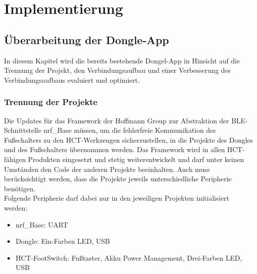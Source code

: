 \section{Implementierung}
\label{Implementierung}

\subsection{Überarbeitung der Dongle-App}
\label{ÜberarbeitungDongleApp}
In diesem Kapitel wird die bereits bestehende Dongel-App in Hinsicht auf die Trennung der Projekt, den Verbindungsaufbau und einer Verbesserung des Verbindungsaufbaus evaluiert und optimiert.

\subsubsection{Trennung der Projekte}
Die Updates für das Framework der Hoffmann Group zur Abstraktion der \ac{BLE}-Schnittstelle nrf\_Base müssen, um die fehlerfreie Kommunikation des Fußschalters zu den \ac{HCT}-Werkzeugen sicherzustellen, in die Projekte des Dongles und des Fußschalters übernommen werden. Das Framework wird in allen \ac{HCT}-fähigen Produkten eingesetzt und stetig weiterentwickelt und darf unter keinen Umständen den Code der anderen Projekte beeinhalten. Auch muss berücksichtigt werden, dass die Projekte jeweils unterschiedliche Peripherie benötigen.\\
Folgende Peripherie darf dabei nur in den jeweiligen Projekten initialisiert werden:
\begin{itemize}
	\item nrf\_Base: \ac{UART}
	\item Dongle: Ein-Farben LED, \ac{USB}
	\item \ac{HCT}-FootSwitch: Fußtaster, Akku Power Management, Drei-Farben LED, \ac{USB}
\end{itemize}

